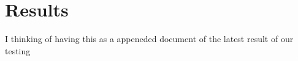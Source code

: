
\chapter{Results} %

\label{Part9Chapter7} %


I thinking of having this as a appeneded document of the latest result of our testing